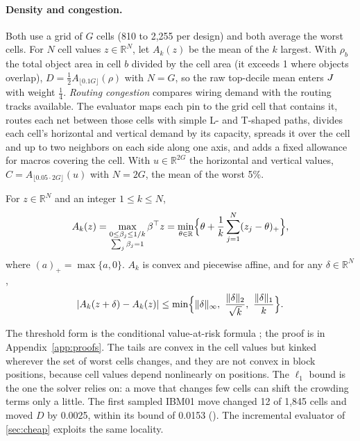 \paragraph{Density and congestion.} Both use a grid of $G$ cells (810 to 2,255 per
design) and both average the worst cells. For $N$ cell values $z\in\mathbb R^N$, let
$A_k(z)$ be the mean of the $k$ largest. With $\rho_b$ the total object area in cell
$b$ divided by the cell area (it exceeds 1 where objects overlap),
$D=\tfrac12A_{\lfloor0.1G\rfloor}(\rho)$ with $N=G$, so the raw top-decile mean
enters $J$ with weight $\tfrac14$. \emph{Routing congestion} compares wiring
demand with the routing tracks available. The evaluator maps each pin to the grid
cell that contains it, routes each net between those cells with simple L- and
T-shaped paths, divides each cell's horizontal and vertical demand by its capacity,
spreads it over the cell and up to two neighbors on each side along one axis, and
adds a fixed allowance for macros covering the cell. With $u\in\mathbb R^{2G}$ the
horizontal and vertical values, $C=A_{\lfloor0.05\cdot2G\rfloor}(u)$ with $N=2G$,
the mean of the worst 5\%.

\begin{lemma}\label{lem:tail}
For $z\in\mathbb R^N$ and an integer $1\le k\le N$,
\begin{equation}
 A_k(z)
 =\max_{\substack{0\le\beta_j\le1/k\\\sum_j\beta_j=1}}\beta^\top z
 =\min_{\theta\in\mathbb R}\Bigl\{\theta+
 \frac1k\sum_{j=1}^N(z_j-\theta)_+\Bigr\},
 \label{eq:tail-representation}
\end{equation}
where $(a)_+=\max\{a,0\}$. $A_k$ is convex and piecewise affine, and for any $\delta\in\mathbb R^N$,
\begin{equation}
 |A_k(z+\delta)-A_k(z)|
 \le\min\Bigl\{\|\delta\|_\infty,\
          \frac{\|\delta\|_2}{\sqrt{k}},\
          \frac{\|\delta\|_1}{k}\Bigr\}.
 \label{eq:tail-stability}
\end{equation}
\end{lemma}
\noindent The threshold form is the conditional value-at-risk formula
\citep{rockafellar2000cvar}; the proof is in Appendix~\ref{app:proofs}. The tails are
convex in the cell values but kinked wherever the set of worst cells changes, and
they are not convex in block positions, because cell values depend nonlinearly on
positions. The $\ell_1$ bound is the one the solver relies on: a move that changes few
cells can shift the crowding terms only a little. The first sampled IBM01 move
changed 12 of 1,845 cells and moved $D$ by 0.0025, within its bound of 0.0153
(\measurement). The incremental evaluator of \cref{sec:cheap} exploits the same
locality.

